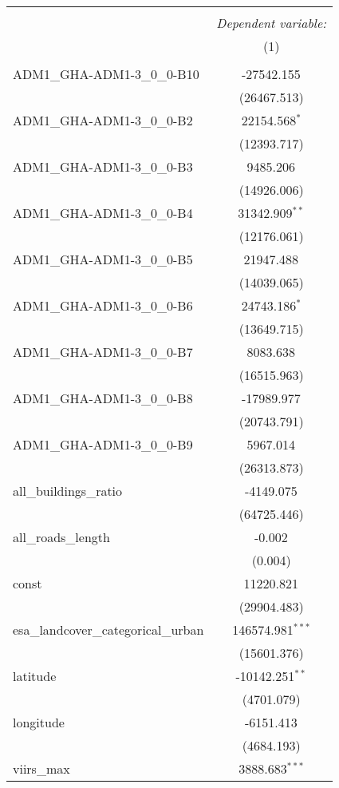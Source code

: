 \begin{table}[!htbp] \centering
\begin{tabular}{@{\extracolsep{5pt}}lc}
\\[-1.8ex]\hline
\hline \\[-1.8ex]
& \multicolumn{1}{c}{\textit{Dependent variable:}} \
\cr \cline{1-2}
\\[-1.8ex] & (1) \\
\hline \\[-1.8ex]
 ADM1_GHA-ADM1-3_0_0-B10 & -27542.155$^{}$ \\
  & (26467.513) \\
 ADM1_GHA-ADM1-3_0_0-B2 & 22154.568$^{*}$ \\
  & (12393.717) \\
 ADM1_GHA-ADM1-3_0_0-B3 & 9485.206$^{}$ \\
  & (14926.006) \\
 ADM1_GHA-ADM1-3_0_0-B4 & 31342.909$^{**}$ \\
  & (12176.061) \\
 ADM1_GHA-ADM1-3_0_0-B5 & 21947.488$^{}$ \\
  & (14039.065) \\
 ADM1_GHA-ADM1-3_0_0-B6 & 24743.186$^{*}$ \\
  & (13649.715) \\
 ADM1_GHA-ADM1-3_0_0-B7 & 8083.638$^{}$ \\
  & (16515.963) \\
 ADM1_GHA-ADM1-3_0_0-B8 & -17989.977$^{}$ \\
  & (20743.791) \\
 ADM1_GHA-ADM1-3_0_0-B9 & 5967.014$^{}$ \\
  & (26313.873) \\
 all_buildings_ratio & -4149.075$^{}$ \\
  & (64725.446) \\
 all_roads_length & -0.002$^{}$ \\
  & (0.004) \\
 const & 11220.821$^{}$ \\
  & (29904.483) \\
 esa_landcover_categorical_urban & 146574.981$^{***}$ \\
  & (15601.376) \\
 latitude & -10142.251$^{**}$ \\
  & (4701.079) \\
 longitude & -6151.413$^{}$ \\
  & (4684.193) \\
 viirs_max & 3888.683$^{***}$ \\

\end{tabular}
\end{table}

